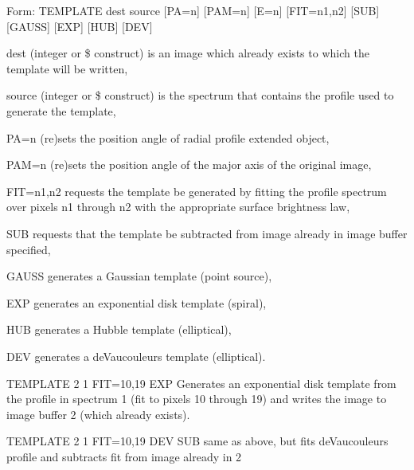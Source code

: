 {\newpage\clearpage
{}%
\begin{command}
  \item[Form: TEMPLATE dest source {[PA=n]} {[PAM=n]} {[E=n]} {[FIT=n1,n2]}
       {[SUB]} {[GAUSS]} {[EXP]} {[HUB]} {[DEV]}\hfill]{}
  \item[dest]{(integer or \$ construct) is an image which already 
       exists to which the template will be written,}
  \item[source]{(integer or \$ construct) is the spectrum that
       contains the profile used to generate the template,}
  \item[PA=n]{(re)sets the position angle of radial profile
       extended object,}
  \item[PAM=n]{(re)sets the position angle of the major axis
       of the original image,}
  \item[FIT=n1,n2]{requests the template be generated by fitting
       the profile spectrum over pixels n1 through n2
       with the appropriate surface brightness law,}
  \item[SUB]{requests that the template be subtracted from
       image already in image buffer specified,}
  \item[GAUSS]{generates a Gaussian template (point source),}
  \item[EXP]{generates an exponential disk template (spiral),}
  \item[HUB]{generates a Hubble template (elliptical),}
  \item[DEV]{generates a deVaucouleurs template (elliptical).}
\end{command}%
\lthtmlfigureZ
\lthtmlcheckvsize\clearpage}

{\newpage\clearpage
{}%
\begin{example}
  \item[TEMPLATE 2 1 FIT=10,19 EXP\hfill]{Generates an exponential disk
       template from the profile in spectrum 1 (fit to pixels 10 through
       19) and writes the image to image buffer 2 (which already exists).}
\par
\item[TEMPLATE 2 1 FIT=10,19 DEV SUB \hfill]{same as above, but fits
       deVaucouleurs profile and subtracts fit from image already in 2}
\end{example}%
\lthtmlfigureZ
\lthtmlcheckvsize\clearpage}


